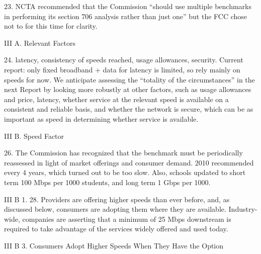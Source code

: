 23. NCTA recommended that the Commission “should use multiple benchmarks in performing its section 706 analysis rather than just one” but the FCC chose not to for this time for clarity.



III A. Relevant Factors

24. latency, consistency of speeds reached, usage allowances, security.
Current report: only fixed broadband + data for latency is limited, so rely mainly on speeds for now. We anticipate assessing the “totality of the circumstances” in the next Report by looking more robustly at other factors, such as usage allowances and price, latency, whether service at the relevant speed is available on a consistent and reliable basis, and whether the network is secure, which can be as important as speed in determining whether service is available.

III B. Speed Factor

26. The Commission has recognized that the benchmark must be periodically reassessed in light of market offerings and consumer demand. 2010 recommended every 4 years, which turned out to be too slow. Also, schools updated to short term 100 Mbps per 1000 students, and long term 1 Gbps per 1000.


III B 1. 28. Providers are offering higher speeds than ever before, and, as discussed below, consumers are adopting them where they are available. Industry-wide, companies are asserting that a minimum of 25 Mbps downstream is required to take advantage of the services widely offered and used today.

III B 3. Consumers Adopt Higher Speeds When They Have the Option

